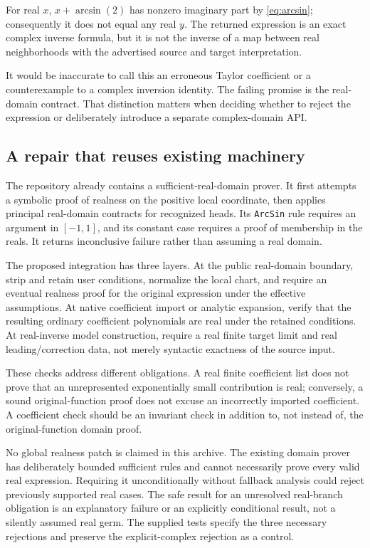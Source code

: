\documentclass[11pt,letterpaper]{article}
\newcommand{\code}[1]{{\small\nolinkurl{#1}}}
\begin{document}
For real $x$, $x+\arcsin(2)$ has nonzero imaginary part by \eqref{eq:arcsin}; consequently it does not equal any real $y$. The returned expression is an exact complex inverse formula, but it is not the inverse of a map between real neighborhoods with the advertised source and target interpretation.

It would be inaccurate to call this an erroneous Taylor coefficient or a counterexample to a complex inversion identity. The failing promise is the real-domain contract. That distinction matters when deciding whether to reject the expression or deliberately introduce a separate complex-domain API.

\subsection{A repair that reuses existing machinery}
The repository already contains a sufficient-real-domain prover. It first attempts a symbolic proof of realness on the positive local coordinate, then applies principal real-domain contracts for recognized heads. Its \code{ArcSin} rule requires an argument in $[-1,1]$, and its constant case requires a proof of membership in the reals. It returns inconclusive failure rather than assuming a real domain.\cite{real-domain}

The proposed integration has three layers. At the public real-domain boundary, strip and retain user conditions, normalize the local chart, and require an eventual realness proof for the original expression under the effective assumptions. At native coefficient import or analytic expansion, verify that the resulting ordinary coefficient polynomials are real under the retained conditions. At real-inverse model construction, require a real finite target limit and real leading/correction data, not merely syntactic exactness of the source input.

These checks address different obligations. A real finite coefficient list does not prove that an unrepresented exponentially small contribution is real; conversely, a sound original-function proof does not excuse an incorrectly imported coefficient. A coefficient check should be an invariant check in addition to, not instead of, the original-function domain proof.

No global realness patch is claimed in this archive. The existing domain prover has deliberately bounded sufficient rules and cannot necessarily prove every valid real expression. Requiring it unconditionally without fallback analysis could reject previously supported real cases. The safe result for an unresolved real-branch obligation is an explanatory failure or an explicitly conditional result, not a silently assumed real germ. The supplied tests specify the three necessary rejections and preserve the explicit-complex rejection as a control.
\end{document}
